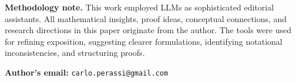 \documentclass[11pt,a4paper]{article}
\theoremstyle{plain}
\theoremstyle{definition}
\begin{document}
\footnotesize
\textbf{Methodology note.} This work employed LLMs as sophisticated editorial assistants. All mathematical insights, proof ideas, conceptual connections, and research directions in this paper originate from the author. The tools were used for refining exposition, suggesting clearer formulations, identifying notational inconsistencies, and structuring proofs.%

\textbf{Author's email:} \texttt{carlo.perassi@gmail.com}
\end{document}
